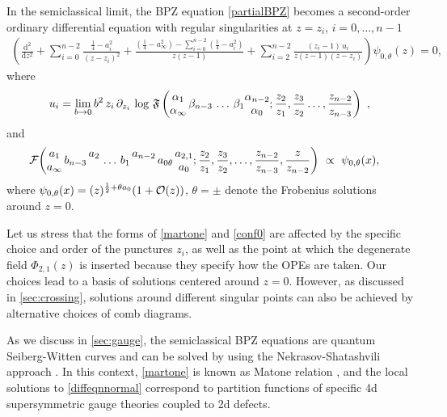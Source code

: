 \documentclass[11pt]{article}
\numberwithin{equation}{section}
\newcommand{\be}{\begin{equation}}
\newcommand{\ee}{\end{equation}}
\newcommand{\ba}{\begin{aligned}}
\newcommand{\ea}{\end{aligned}}
\newcommand{\Fns}[8]{\mathcal{F}\bigg( \begin{matrix} #2 \\ #1 \end{matrix} \, #3 \, \begin{matrix} #4  \\ \, \end{matrix} \,#5 \, #6\,\begin{matrix} #7 \\  \, \end{matrix} \, #8 \, }
\begin{document}
%
%
In the semiclassical limit, the BPZ equation \eqref{partialBPZ}  becomes a second-order ordinary differential equation with regular singularities at $z=z_i$, $i=0,\dots,n-1$
%
\begin{equation}\label{diffeqnnormal}
\begin{aligned}
\left(\frac{\mathrm{d}^2}{\mathrm{d}z^2}+\sum_{i=0}^{n-2}\frac{\frac{1}{4}-a_{i}^2}{(z-z_i)^2}+\frac{(\frac{1}{4}-a_{\infty}^2)-\sum_{i=0}^{n-2}\left(\frac{1}{4}-a_{i}^2\right)}{z(z-1)}+\sum_{i=2}^{n-2}\frac{(z_i-1)\,u_i}{z(z-1)(z-z_i)}\right)\psi_{0,\theta}(z)=0,
\end{aligned}
\end{equation}
where 
\be\label{martone} u_i=\lim_{b\to 0}b^2\,z_i\,\partial_{z_i}\,\log\,\mathfrak{F}\left(\begin{matrix} \alpha_{1} \\ \alpha_{\infty}\end{matrix}\,\beta_{n-3}\,\dots\,\beta_1\begin{matrix} \alpha_{n-2} \\ \alpha_0\end{matrix};{z_2\over z_1},\frac{z_3}{z_2}\dots,\frac{z_{n-2}}{z_{n-3}}\right)~,\ee
and
\be \label{conf0}\ba 
\Fns{a_{\infty}}{a_{1}}{b_{n-3}}{a_{2}}{\dots}{b_1}{a_{n-2}}{a_{0\theta}}\begin{matrix} a_{2,1} \\ a_0\end{matrix};{z_2\over z_1},\frac{z_3}{z_2},\dots,\frac{z_{n-2}}{z_{n-3}},\frac{z}{z_{n-2}}\bigg)~&\propto~\psi_{0,\theta}(x),\ea\ee
where $ \psi_{0,\theta}(x)=(z)^{{1\over 2}+\theta a_0}(1+\mathcal{O}(z))$, $\theta=\pm $ denote the Frobenius solutions around $z=0$. 

Let us stress that the forms of \eqref{martone} and \eqref{conf0} are affected by the specific choice and order of the punctures \( z_i \), as well as the point at which the degenerate field \( \Phi_{2,1}(z) \) is inserted because they specify how the OPEs are taken. Our choices lead to a basis of solutions centered around \( z=0 \). However, as discussed in \autoref{sec:crossing}, solutions around different singular points can also be achieved by alternative choices of comb diagrams.

%
As we  discuss in \autoref{sec:gauge}, the semiclassical BPZ equations are quantum Seiberg-Witten curves and can be solved by using the Nekrasov-Shatashvili approach \cite{ns}.
In this context,
\eqref{martone} is  known as Matone relation \cite{Matone:1995rx,Flume:2004rp,lmn},
 and the local solutions to \eqref{diffeqnnormal} correspond to partition functions of specific 4d supersymmetric gauge theories coupled to 2d defects. 
\end{document}
